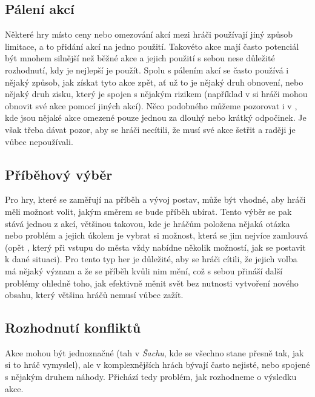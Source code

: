\subsection{Pálení akcí}
\label{subsec:actions_burning_actions}

Některé hry místo ceny nebo omezování akcí mezi hráči používají jiný způsob limitace, a to přidání akcí na jedno použití. Takovéto akce mají často potenciál být mnohem silnější než běžné akce a jejich použití s sebou nese důležité rozhodnutí, kdy je nejlepší je použít. Spolu s pálením akcí se často používá i nějaký způsob, jak získat tyto akce zpět, ať už to je nějaký druh obnovení, nebo nějaký druh zisku, který je spojen s nějakým rizikem (například v  si hráči mohou obnovit své akce pomocí jiných akcí). Něco podobného můžeme pozorovat i v , kde jsou nějaké akce omezené pouze jednou za dlouhý nebo krátký odpočinek. Je však třeba dávat pozor, aby se hráči necítili, že musí své akce šetřit a raději je vůbec nepoužívali.

\subsection{Příběhový výběr}
\label{subsec:actions_story_choice}

Pro hry, které se zaměřují na příběh a vývoj postav, může být vhodné, aby hráči měli možnost volit, jakým směrem se bude příběh ubírat. Tento výběr se pak stává jednou z akcí, většinou takovou, kde je hráčům položena nějaká otázka nebo problém a jejich úkolem je vybrat si možnost, která se jim nejvíce zamlouvá (opět , který při vstupu do města vždy nabídne několik možností, jak se postavit k dané situaci). Pro tento typ her je důležité, aby se hráči cítili, že jejich volba má nějaký význam a že se příběh kvůli nim mění, což s sebou přináší další problémy ohledně toho, jak efektivně měnit svět bez nutnosti vytvoření nového obsahu, který většina hráčů nemusí vůbec zažít.

\subsection{Rozhodnutí konfliktů}
\label{subsec:actions_action_resolution}

Akce mohou být jednoznačné (tah v \textit{Šachu}, kde se všechno stane přesně tak, jak si to hráč vymyslel), ale v komplexnějších hrách bývají často nejisté, nebo spojené s nějakým druhem náhody. Přichází tedy problém, jak rozhodneme o výsledku akce.

